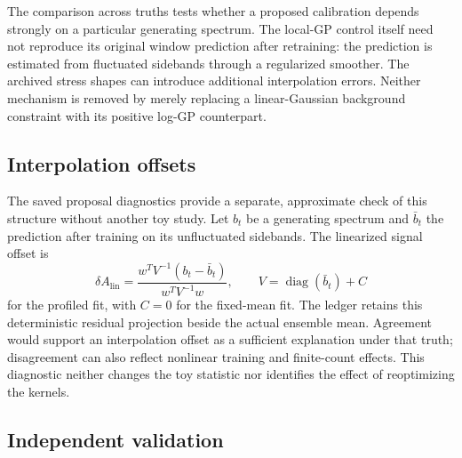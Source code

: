 The comparison across truths tests whether a proposed calibration depends
strongly on a particular generating spectrum. The local-GP control itself
need not reproduce its original window prediction after retraining: the
prediction is estimated from fluctuated sidebands through a regularized
smoother. The archived stress shapes can introduce additional interpolation
errors. Neither mechanism is removed by merely replacing a linear-Gaussian
background constraint with its positive log-GP counterpart.

\clearpage
\subsection{Interpolation offsets}
The saved proposal diagnostics provide a separate, approximate check of this
structure without another toy study. Let $b_t$ be a generating spectrum and
$\bar b_t$ the prediction after training on its unfluctuated sidebands.
The linearized signal offset is
\begin{equation}
 \delta A_{\mathrm{lin}}=
 \frac{w^T V^{-1}(b_t-\bar b_t)}{w^T V^{-1}w},\qquad
 V=\operatorname{diag}(\bar b_t)+C
\end{equation}
for the profiled fit, with $C=0$ for the fixed-mean fit. The ledger retains
this deterministic residual projection beside the actual ensemble mean.
Agreement would support an interpolation offset as a sufficient explanation
under that truth; disagreement can also reflect nonlinear training and
finite-count effects. This diagnostic neither changes the toy statistic nor
identifies the effect of reoptimizing the kernels.


\clearpage
\subsection{Independent validation}


